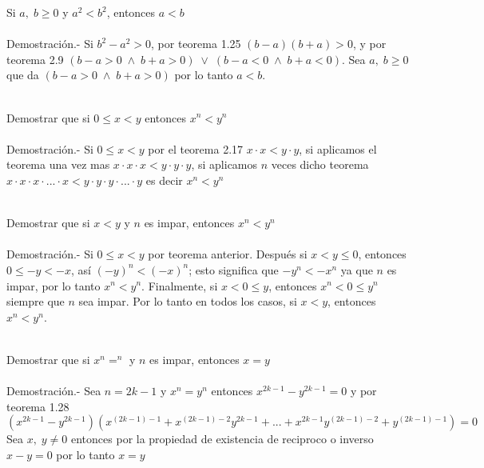 \begin{teo}
Si $a, \; b \geq 0$ y $a^2<b^2$, entonces $a<b$\\\\
Demostración.- \;
Si $b^2-a^2>0$, por teorema 1.25 \; $(b-a)(b+a)>0$, y por teorema 2.9 \; $( b-a>0 \; \land \; b+a>0 ) \; \lor \; ( b-a<0 \; \land \; b+a<0 ) $. Sea $a,\; b\geq 0$ que da $(b-a>0 \; \land \; b+a>0)$ por lo tanto $a<b$.\\\\
\end{teo}   
   
\begin{teo}
Demostrar que si $0 \leq x<y $ entonces $x^n<y^n$\\\\
Demostración.- \;
Si $0 \leq x < y$ por el teorema 2.17 \; $x\cdot x < y \cdot y $, si aplicamos el teorema una vez mas $x\cdot x \cdot x < y \cdot y \cdot y$, si aplicamos $n$ veces dicho teorema $x\cdot x \cdot x \cdot ... \cdot x < y \cdot y \cdot y \cdot ... \cdot y $ es decir $x^n<y^n$\\\\
\end{teo}
   
\begin{teo}
Demostrar que si $x<y$ y $n$ es impar, entonces $x^n<y^n$\\\\
Demostración.- \; Si $0\leq x < y$ por teorema anterior. Después si $x<y\leq 0$, entonces $0\leq -y < -x$, así $(-y)^n<(-x)^n$; esto significa que $-y^n<-x^n$ ya que $n$ es impar, por lo tanto $x^n<y^n$. Finalmente, si $x<0 \leq y$, entonces $x^n<0 \leq y^n$ siempre que $n$ sea impar. Por lo tanto en todos los casos, si $x<y$, entonces $x^n<y^n$.\\\\

\end{teo}   

\begin{teo}
Demostrar que si $x^n=  ^n$ y $n$ es impar, entonces $x=y$\\\\
Demostración.- \;
Sea $n=2k-1$ y $x^n=y^n$ entonces $x^{2k-1}-y^{2k-1}=0$ y por teorema 1.28 \; $(x^{2k-1}-y^{2k-1})(x^{(2k-1)-1}+x^{(2k-1)-2}y^{2k-1}+...+x^{2k-1}y^{(2k-1)-2}+y^{(2k-1)-1})=0$ Sea $x, \; y \neq 0$ entonces por la propiedad de existencia de reciproco o inverso\, $x-y=0$ por lo tanto $x=y$\\\\
\end{teo}

